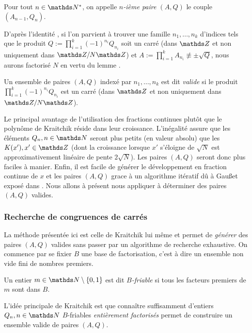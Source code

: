 \begin{definition}
	Pour tout $n\in \N^*$, on appelle \emph{$n$-ième paire $(A, Q)$} le couple
	$(A_{n-1}, Q_n)$.
\end{definition}

D'après l'identité , si l'on parvient à trouver une famille $n_1,
\dots, n_k$ d'indices tels que le produit $Q:=\prod_{i=1}^k (-1)^{n_i} Q_{n_i}$
soit un carré (dans $\Z$ et non uniquement dans $\Z/N\Z$) et $A := \prod_{i=1}^k
A_{n_i} \not\equiv \pm\sqrt{Q}$, nous aurons factorisé $N$ en vertu du lemme
.

\begin{definition}
	Un ensemble de paires $(A, Q)$ indexé par $n_1, \dots, n_k$ est dit
	\emph{valide} si le produit $\prod_{i=1}^k (-1)^{n_i} Q_{n_i}$ est un carré
	(dans $\Z$ et non uniquement dans $\Z/N\Z$).
\end{definition}

Le principal avantage de l'utilisation des fractions continues plutôt que le
polynôme de Kraitchik réside dans leur croissance. L'inégalité  assure
que les éléments $Q_n, n\in \N$ seront plus petits (en valeur absolu) que les
$K(x'), x'\in \Z$ (dont la croissance lorsque $x'$ s'éloigne de $\sqrt{N}$ est
approximativement linéaire de pente $2\sqrt{N}$). Les paires $(A, Q)$ seront
donc plus faciles à manier. Enfin, il est facile de générer le développement en
fraction continue de $x$ et les paires $(A, Q)$ grace à un algorithme itératif
dû à Gau\ss et exposé dans . Nous allons à présent nous appliquer à
déterminer des paires $(A, Q)$ valides.

\subsubsection{Recherche de congruences de carrés}

La méthode présentée ici est celle de Kraitchik lui même et permet de
\emph{générer} des paires $(A, Q)$ valides sans passer par un algorithme de
recherche exhaustive. On commence par se fixier $B$ une base de factorisation,
c'est à dire un ensemble non vide fini de nombres premiers.

\begin{definition}
	Un entier $m\in \N\setminus \{0, 1\}$ est dit \emph{$B$-friable} si tous
	les facteurs premiers de $m$ sont dans $B$.
\end{definition}

L'idée principale de Kraitchik est que connaître suffisamment d'entiers $Q_n,
n\in \N$ $B$-friables \emph{entièrement factorisés} permet de construire un
ensemble valide de paires $(A, Q)$.

